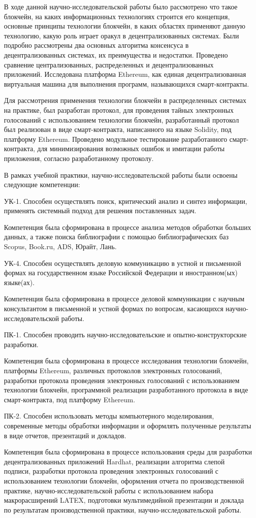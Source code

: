 \conclusion

В ходе данной научно-исследовательской работы было рассмотрено что такое блокчейн, на каких информационных технологиях строится его концепция, основные принципы технологии блокчейн, в каких областях применяют данную технологию, какую роль играет оракул в децентрализованных системах. Были подробно рассмотрены два основных алгоритма консенсуса в децентрализованных системах, их преимущества и недостатки. Проведено сравнение централизованных, распределенных и децентрализованных приложений. Исследована платформа Ethereum, как единая децентрализованная виртуальная машина для выполнения программ, называющихся смарт-контракты.

Для рассмотрения применения технологии блокчейн в распределенных системах на практике, был разработан протокол, для проведения тайных электронных голосований с использованием технологии блокчейн, разработанный протокол был реализован в виде смарт-контракта, написанного на языке Solidity, под платформу Ethereum. Проведено модульное тестирование разработанного смарт-контракта, для минимизирования возможных ошибок и имитации работы приложения, согласно разработанному протоколу.

В рамках учебной практики, научно-исследовательской работы были освоены следующие компетенции:

УК-1. Способен осуществлять поиск, критический анализ и синтез информации, применять системный подход для решения поставленных задач.

Компетенция была сформирована в процессе анализа методов обработки больших данных, а также поиска библиографии с помощью библиографических баз Scopus, Book.ru, ADS, Юрайт, Лань.

УК-4. Способен осуществлять деловую коммуникацию в устной и письменной формах на государственном языке Российской Федерации и иностранном(ых) языке(ах).

Компетенция была сформирована в процессе деловой коммуникации с научным консультантом в письменной и устной формах по вопросам, касающихся научно-исследовательской работы.

ПК-1. Способен проводить научно-исследовательские и опытно-конструкторские разработки.

Компетенция была сформирована в процессе исследования технологии блокчейн, платформы Ethereum, различных протоколов электронных голосований, разработки протокола проведения электронных голосований с использованием технологии блокчейн, программной реализации разработанного протокола в виде смарт-контракта, под платформу Ethereum.

ПК-2. Способен использовать методы компьютерного моделирования, современные методы обработки информации и оформлять полученные результаты в виде отчетов, презентаций и докладов.

Компетенция была сформирована в процессе использования среды для разработки децентрализованных приложений Hardhat, реализации алгоритма слепой подписи, разработки протокола проведения электронных голосований с использованием технологии блокчейн, оформления отчета по производственной практике, научно-исследовательской работы с использованием набора макрорасширений LATEX, подготовки мультимедийной презентации и доклада по результатам производственной практики, научно-исследовательской работы.